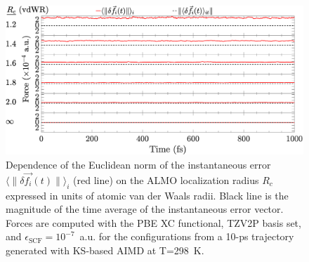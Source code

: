 \documentclass[aps,prl,reprint,amsmath,amssymb]{revtex4-1}
\begin{document}
\begin{figure}[!htb]
\includegraphics[trim={0cm 0cm 0.1cm 0.1cm},clip,width=\textwidth]{DeltaForceComparison_ALMO_SCF.eps}
\caption{\label{fig:forcecomp} Dependence of the Euclidean norm of the instantaneous error $\langle \| \delta \vec{f_{i}}(t) \| \rangle_{i}$ (red line) on the ALMO localization radius $R_c$ expressed in units of atomic van der Waals radii. Black line is the magnitude of the time average of the instantaneous error vector. %
Forces are computed with the PBE XC functional, TZV2P basis set, and $\epsilon_{\text{SCF}} = 10^{-7}$~a.u. for the configurations from a 10-ps trajectory generated with KS-based AIMD at T=298~K.}
\end{figure}



\fi %
\end{document}
